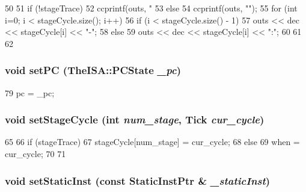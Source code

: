 \begin{DoxyCode}
50 {
51   if (!stageTrace) {
52     ccprintf(outs, "%
53   } else {
54     ccprintf(outs, "");
55     for (int i=0; i < stageCycle.size(); i++) {
56         if (i < stageCycle.size() - 1)
57             outs << dec << stageCycle[i] << "-";
58         else
59             outs << dec << stageCycle[i] << ":";
60     }
61   }
62 }
\end{DoxyCode}
\hypertarget{classTrace_1_1InOrderTraceRecord_a227dba1d95b77dae86973f7598eafe22}{
\subsubsection[{setPC}]{\setlength{\rightskip}{0pt plus 5cm}void setPC (TheISA::PCState {\em \_\-pc})}}
\label{classTrace_1_1InOrderTraceRecord_a227dba1d95b77dae86973f7598eafe22}



\begin{DoxyCode}
79 { pc = _pc; }
\end{DoxyCode}
\hypertarget{classTrace_1_1InOrderTraceRecord_a9f6f4ef19754061e12cbb7c9fa454b86}{
\subsubsection[{setStageCycle}]{\setlength{\rightskip}{0pt plus 5cm}void setStageCycle (int {\em num\_\-stage}, \/  {\bf Tick} {\em cur\_\-cycle})}}
\label{classTrace_1_1InOrderTraceRecord_a9f6f4ef19754061e12cbb7c9fa454b86}



\begin{DoxyCode}
65     {
66         if (stageTrace) {
67             stageCycle[num_stage] = cur_cycle;
68         } else {
69             when = cur_cycle;
70         }
71     }
\end{DoxyCode}
\hypertarget{classTrace_1_1InOrderTraceRecord_a09099c2b21e9688c3bff2ffa0e719cc8}{
\subsubsection[{setStaticInst}]{\setlength{\rightskip}{0pt plus 5cm}void setStaticInst (const {\bf StaticInstPtr} \& {\em \_\-staticInst})}}
\label{classTrace_1_1InOrderTraceRecord_a09099c2b21e9688c3bff2ffa0e719cc8}



